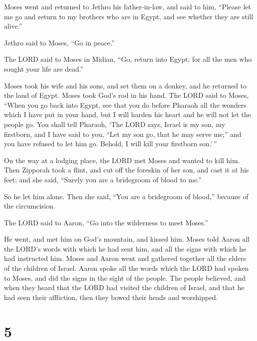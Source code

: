  Moses went and returned to Jethro his father-in-law, and
said to him, ``Please let me go and return to my brothers who are in
Egypt, and see whether they are still alive.''

Jethro said to Moses, ``Go in peace.''

 The LORD said to Moses in Midian, ``Go, return into
Egypt; for all the men who sought your life are dead.''

 Moses took his wife and his sons, and set them on a
donkey, and he returned to the land of Egypt. Moses took God's rod in
his hand.  The LORD said to Moses, ``When you go back
into Egypt, see that you do before Pharaoh all the wonders which I have
put in your hand, but I will harden his heart and he will not let the
people go.  You shall tell Pharaoh, `The LORD says,
Israel is my son, my firstborn,  and I have said to you,
``Let my son go, that he may serve me;'' and you have refused to let him
go. Behold, I will kill your firstborn son.'\,''

 On the way at a lodging place, the LORD met Moses and
wanted to kill him.  Then Zipporah took a flint, and cut
off the foreskin of her son, and cast it at his feet; and she said,
``Surely you are a bridegroom of blood to me.''

 So he let him alone. Then she said, ``You are a
bridegroom of blood,'' because of the circumcision.

 The LORD said to Aaron, ``Go into the wilderness to meet
Moses.''

He went, and met him on God's mountain, and kissed him. 
Moses told Aaron all the LORD's words with which he had sent him, and
all the signs with which he had instructed him.  Moses
and Aaron went and gathered together all the elders of the children of
Israel.  Aaron spoke all the words which the LORD had
spoken to Moses, and did the signs in the sight of the people.
 The people believed, and when they heard that the LORD
had visited the children of Israel, and that he had seen their
affliction, then they bowed their heads and worshipped.

\hypertarget{section-4}{%
\section{5}\label{section-4}}

